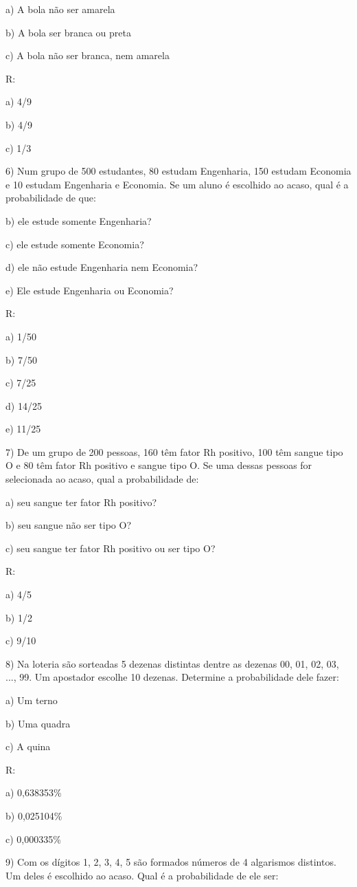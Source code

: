 a) A bola não ser amarela

b) A bola ser branca ou preta

c) A bola não ser branca, nem amarela

R:

a) 4/9

b) 4/9

c) 1/3

6) Num grupo de 500 estudantes, 80 estudam Engenharia, 150 estudam
Economia e 10 estudam Engenharia e Economia. Se um aluno é escolhido ao
acaso, qual é a probabilidade de que:

b) ele estude somente Engenharia?

c) ele estude somente Economia?

d) ele não estude Engenharia nem Economia?

e) Ele estude Engenharia ou Economia?

R:

a) 1/50

b) 7/50

c) 7/25

d) 14/25

e) 11/25

7) De um grupo de 200 pessoas, 160 têm fator Rh positivo, 100 têm sangue
tipo O e 80 têm fator Rh positivo e sangue tipo O. Se uma dessas pessoas
for selecionada ao acaso, qual a probabilidade de:

a) seu sangue ter fator Rh positivo?

b) seu sangue não ser tipo O?

c) seu sangue ter fator Rh positivo ou ser tipo O?

R:

a) 4/5

b) 1/2

c) 9/10

8) Na loteria são sorteadas 5 dezenas distintas dentre as dezenas 00,
01, 02, 03, ..., 99. Um apostador escolhe 10 dezenas. Determine a
probabilidade dele fazer:

a) Um terno

b) Uma quadra

c) A quina

R:

a) 0,638353\%

b) 0,025104\%

c) 0,000335\%

9) Com os dígitos 1, 2, 3, 4, 5 são formados números de 4 algarismos
distintos. Um deles é escolhido ao acaso. Qual é a probabilidade de ele
ser:

